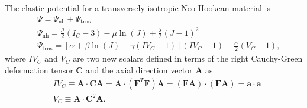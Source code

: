 The elastic potential for a transversely isotropic Neo-Hookean material is \cite{Bonet:1998vc}
%
\begin{align}
&\Psi = \Psi_{\text{nh}} + \Psi_{\text{trns}} \nonumber\\ \ \
&\Psi_{\text{nh}} = \frac{\mu}{2}\left(I_C - 3\right) - \mu \ln(J) + \frac{\lambda}{2}\left(J - 1\right)^2 \nonumber\\ \ \
&\Psi_{\text{trns}} = \left[ \alpha + \beta \ln(J) + \gamma (IV_C - 1)\right] (IV_C - 1) - \frac{\alpha}{2}\left(V_C - 1\right), 
\label{eq:psi_trns_iso}
\end{align}
%
where $IV_C$ and $V_C$ are two new scalars defined in terms of the right Cauchy-Green deformation tensor $\pmb{C}$ and the axial direction vector $\pmb{A}$ as
%
\begin{align}
&IV_C \equiv \pmb{A} \cdot \pmb{C} \pmb{A} = \pmb{A}\cdot(\pmb{F}^T\pmb{F})\pmb{A} = (\pmb{F}\pmb{A})\cdot(\pmb{F}\pmb{A}) = \pmb{a} \cdot \pmb{a} \nonumber\\
&V_C \equiv \pmb{A} \cdot \pmb{C}^2 \pmb{A} .
\label{eq:invariants_trns_iso}
\end{align}
%

